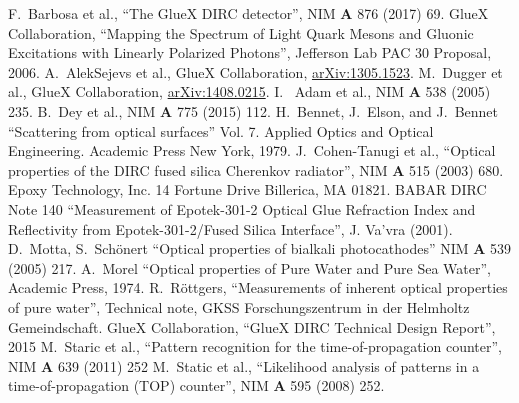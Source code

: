 \documentclass[11pt, a4paper]{article}
\begin{document}
\newpage

\begin{thebibliography}{1}
 F.~Barbosa et al., ``The GlueX DIRC detector'', NIM \textbf{A} 876 (2017) 69.
 GlueX Collaboration, ``Mapping the Spectrum of Light Quark Mesons and Gluonic Excitations with Linearly Polarized Photons'', Jefferson Lab PAC 30 Proposal, 2006.
 A.~AlekSejevs et al., GlueX Collaboration, \url{arXiv:1305.1523}.
 M.~Dugger et al., GlueX Collaboration, \url{arXiv:1408.0215}. 
 I.~ Adam et al., NIM \textbf{A} 538 (2005) 235.
 B.~Dey et al., NIM \textbf{A} 775 (2015) 112.
 H.~Bennet, J.~Elson, and J.~Bennet ``Scattering from optical surfaces'' Vol. 7. Applied Optics and Optical Engineering. Academic Press New York, 1979.
 J.~Cohen-Tanugi et al., ``Optical properties of the DIRC fused silica Cherenkov radiator'', NIM \textbf{A} 515 (2003) 680. 
 Epoxy Technology, Inc. 14 Fortune Drive Billerica, MA 01821.
 BABAR DIRC Note 140 ``Measurement of Epotek-301-2 Optical Glue Refraction Index and Reflectivity from Epotek-301-2/Fused Silica Interface'', J. Va'vra (2001).
 D.~Motta, S.~Sch{\"o}nert ``Optical properties of bialkali photocathodes'' NIM \textbf{A} 539 (2005) 217. 
 A.~Morel ``Optical properties of Pure Water and Pure Sea Water'', Academic Press, 1974.
 R.~R{\"o}ttgers, ``Measurements of inherent optical properties of pure water'', Technical note, GKSS Forschungszentrum in der Helmholtz Gemeindschaft.
 GlueX Collaboration, ``GlueX DIRC Technical Design Report'', 2015  
 M.~Staric et al., ``Pattern recognition for the time-of-propagation counter'', NIM \textbf{A} 639 (2011) 252
 M.~Static et al., ``Likelihood analysis of patterns in a time-of-propagation (TOP) counter'', NIM \textbf{A} 595 (2008) 252.
\end{thebibliography}
\end{document}
